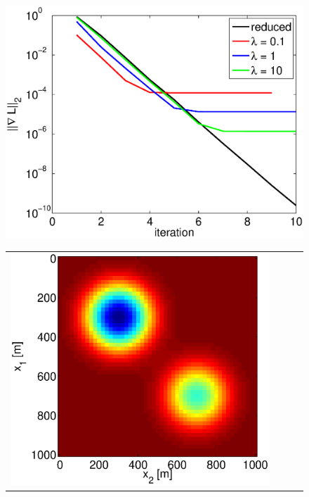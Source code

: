 \documentclass{iopart}
\begin{document}
\begin{figure}
\centering
\includegraphics[scale=.4]{./figs/2D_exp1_c}\\
\centering
\begin{tabular}{cccc}
\includegraphics[scale=.2]{./figs/2D_exp1_d}&

\end{tabular}
\end{figure}
\end{document}

